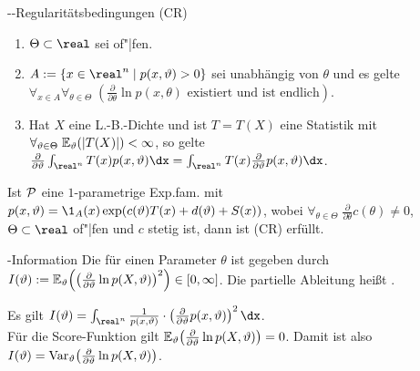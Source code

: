 \begin{Def}{--Regularitätsbedingungen (CR)}
    \begin{enumerate}
        \item
        $\Theta \subset \real$ sei of"|fen.
        
        \item
        $A := \{x \in \real^n \;|\; p(x, \theta) > 0\}$ sei unabhängig von $\theta$ und es gelte\\
        $\forall_{x \in A} \forall_{\theta \in \Theta}\; (\frac{\partial}{\partial \theta} 
        \ln p(x, \theta) \text{ existiert und ist endlich})$.
        
        \item
        Hat $X$ eine L.-B.-Dichte und ist $T = T(X)$ eine Statistik mit
        $\forall_{\theta \in \Theta}\; \EE_\theta(|T(X)|) < \infty$, so gelte
        $\frac{\partial}{\partial \theta} \int_{\real^n} T(x) p(x, \theta) \dx =
        \int_{\real^n} T(x) \frac{\partial}{\partial \theta} p(x, \theta) \dx$.
    \end{enumerate}
\end{Def}

\begin{Bem}
    Ist $\P$ eine $1$-parametrige Exp.fam. mit
    $p(x, \theta) = \1_A(x) \exp(c(\theta)T(x) + d(\theta) + S(x))$, wobei
    $\forall_{\theta \in \Theta}\; \frac{\partial}{\partial \theta} c(\theta) \not= 0$,
    $\Theta \subset \real$ of"|fen und $c$ stetig ist, dann ist (CR) erfüllt.
\end{Bem}

\linie

\begin{Def}{-Information}
    Die  für einen Parameter $\theta$ ist gegeben durch
    $I(\theta) := \EE_\theta\!\left(\left(\frac{\partial}{\partial \theta} \ln p(X, \theta)
    \right)^2\right) \in [0, \infty]$.
    Die partielle Ableitung heißt .
\end{Def}

\begin{Bem}
    Es gilt
    $I(\theta) = \int_{\real^n} \frac{1}{p(x, \theta)} \cdot \left(\frac{\partial}{\partial \theta}
    p(x, \theta)\right)^2 \dx$.\\
    Für die Score-Funktion gilt
    $\EE_\theta\!\left(\frac{\partial}{\partial \theta} \ln p(X, \theta)\right) = 0$.
    Damit ist also $I(\theta) =
    \Var_\theta\!\left(\frac{\partial}{\partial \theta} \ln p(X, \theta)\right)$.
\end{Bem}

